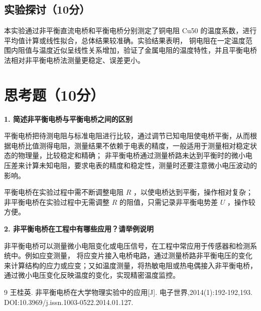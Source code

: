 \documentclass{Phyport}
\begin{document}
\subsection{实验探讨（10分）}

本实验通过非平衡直流电桥和平衡电桥分别测定了铜电阻 Cu50 的温度系数，进行平均值计算或线性拟合，总体结果较准确。实验结果表明，
铜电阻在一定温度范围内阻值与温度近似呈线性关系增加，验证了金属电阻的温度特性，并且平衡电桥法相对非平衡电桥法测量更稳定、误差更小。

\section{思考题（10分）}

\textbf{1. 简述非平衡电桥与平衡电桥之间的区别}

平衡电桥把待测电阻与标准电阻进行比较，通过调节已知电阻使电桥平衡，从而根据电桥比值测得电阻，测量结果不依赖于电表的精度，一般适用于测量相对稳定状态的物理量，比较稳定和精确；
非平衡电桥通过测量桥路未达到平衡时的微小电压差来计算未知电阻，要求电表的精度和稳定性，测量时还要注意微小电压波动的影响。

平衡电桥在实验过程中需不断调整电阻 $R$ ，以使电桥达到平衡，操作相对复杂；非平衡电桥在实验过程中无需调整 $R$ 的阻值，只需记录非平衡电势差 $U$ ，操作较方便。

\textbf{2. 非平衡电桥在工程中有哪些应用？请举例说明}

非平衡电桥可以测量微小电阻变化或电压信号，在工程中常应用于传感器和检测系统中。例如应变测量，
将应变片接入电桥电路，通过测量桥路非平衡电压的变化来计算结构的应力或应变；又如温度测量，将热敏电阻或热电偶接入非平衡电桥，
通过微小电压变化反映温度的变化，实现精密温度监控。

\begin{thebibliography}{9}
    王桂英. 非平衡电桥在大学物理实验中的应用[J]. 电子世界,2014(1):192-192,193. DOI:10.3969/j.issn.1003-0522.2014.01.127. 

\end{thebibliography}


\end{document}
